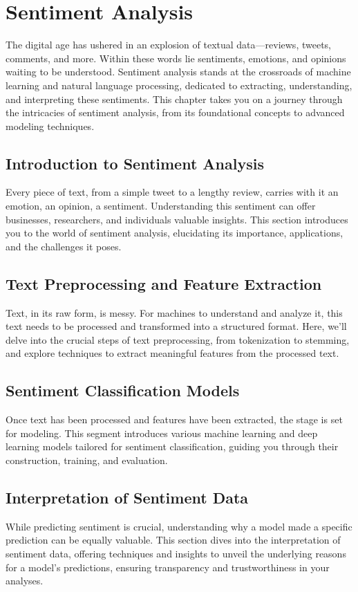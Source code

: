 \documentclass[a4paper,12pt]{book}
\begin{document}

\chapter{Sentiment Analysis}
The digital age has ushered in an explosion of textual data—reviews, tweets, comments, and more. Within these words lie sentiments, emotions, and opinions waiting to be understood. Sentiment analysis stands at the crossroads of machine learning and natural language processing, dedicated to extracting, understanding, and interpreting these sentiments. This chapter takes you on a journey through the intricacies of sentiment analysis, from its foundational concepts to advanced modeling techniques.

\section{Introduction to Sentiment Analysis}
Every piece of text, from a simple tweet to a lengthy review, carries with it an emotion, an opinion, a sentiment. Understanding this sentiment can offer businesses, researchers, and individuals valuable insights. This section introduces you to the world of sentiment analysis, elucidating its importance, applications, and the challenges it poses.

\section{Text Preprocessing and Feature Extraction}
Text, in its raw form, is messy. For machines to understand and analyze it, this text needs to be processed and transformed into a structured format. Here, we'll delve into the crucial steps of text preprocessing, from tokenization to stemming, and explore techniques to extract meaningful features from the processed text.

\section{Sentiment Classification Models}
Once text has been processed and features have been extracted, the stage is set for modeling. This segment introduces various machine learning and deep learning models tailored for sentiment classification, guiding you through their construction, training, and evaluation.

\section{Interpretation of Sentiment Data}
While predicting sentiment is crucial, understanding why a model made a specific prediction can be equally valuable. This section dives into the interpretation of sentiment data, offering techniques and insights to unveil the underlying reasons for a model's predictions, ensuring transparency and trustworthiness in your analyses.
\end{document}
